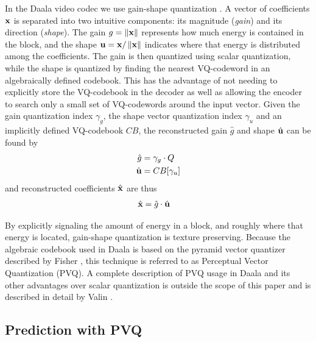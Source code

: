 \documentclass[conference, 10pt]{IEEEtran}
\begin{document}
In the Daala video codec we use gain-shape quantization \cite{DaalaDemo6}.
A vector of coefficients ${\bf x}$ is separated into two intuitive components:
 its magnitude ({\em gain}) and its direction ({\em shape}).
The gain $g=\left\|{\bf x}\right\|$ represents how much energy is contained in the
 block, and the shape ${\bf u}={\bf x}/\left\|{\bf x}\right\|$ indicates where that energy is
 distributed among the coefficients.
The gain is then quantized using scalar quantization, while the shape is
 quantized by finding the nearest VQ-codeword in an algebraically defined
 codebook.
This has the advantage of not needing to explicitly store the VQ-codebook in
 the decoder as well as allowing the encoder to search only a small set of
 VQ-codewords around the input vector.
Given the gain quantization index $\gamma_g$, the shape vector quantization
 index $\gamma_u$ and an implicitly defined VQ-codebook $CB$, the reconstructed
 gain $\hat{g}$ and shape $\hat{{\bf u}}$ can be found by
\begin{align}
\hat{g} & = \gamma_g \cdot Q \\
\hat{{\bf u}} & = CB[{\gamma_u}]
\end{align}
and reconstructed coefficients $\hat{{\bf x}}$ are thus
\begin{align}
\hat{{\bf x}} & = \hat{g}\cdot \hat{{\bf u}}
\end{align}

By explicitly signaling the amount of energy in a block, and roughly where that
 energy is located, gain-shape quantization is texture preserving.
Because the algebraic codebook used in Daala is based on the pyramid vector
 quantizer described by Fisher \cite{Fisher1986}, this technique is referred to
 as Perceptual Vector Quantization (PVQ).
A complete description of PVQ usage in Daala and its other advantages over
 scalar quantization is outside the scope of this paper and is described
 in detail by Valin \cite{valin2015spie}.

\subsection{Prediction with PVQ}
\label{sec:pred}
\end{document}
